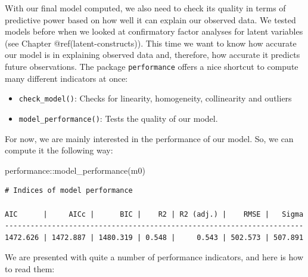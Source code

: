 \documentclass[
  letterpaper,
]{krantz}
\makeatletter
\newenvironment{Shaded}{\begin{snugshade}}{\end{snugshade}}
\newcommand{\FunctionTok}[1]{\textcolor[rgb]{0.28,0.35,0.67}{#1}}
\newcommand{\NormalTok}[1]{\textcolor[rgb]{0.00,0.23,0.31}{#1}}
\newcommand{\SpecialCharTok}[1]{\textcolor[rgb]{0.37,0.37,0.37}{#1}}
\newenvironment{kframe}{%
\medskip{}
\setlength{\fboxsep}{.8em}
 \def\at@end@of@kframe{}%
 \ifinner\ifhmode%
  \def\at@end@of@kframe{\end{minipage}}%
  \begin{minipage}{\columnwidth}%
 \fi\fi%
 \def\FrameCommand##1{\hskip\@totalleftmargin \hskip-\fboxsep
 \colorbox{shadecolor}{##1}\hskip-\fboxsep
     \hskip-\linewidth \hskip-\@totalleftmargin \hskip\columnwidth}%
 \MakeFramed {\advance\hsize-\width
   \@totalleftmargin\z@ \linewidth\hsize
   \@setminipage}}%
 {\par\unskip\endMakeFramed%
 \at@end@of@kframe}
\renewenvironment{Shaded}{\begin{kframe}}{\end{kframe}}
\makeatother
\begin{document}
With our final model computed, we also need to check its quality in
terms of predictive power based on how well it can explain our observed
data. We tested models before when we looked at confirmatory factor
analyses for latent variables (see Chapter @ref(latent-constructs)).
This time we want to know how accurate our model is in explaining
observed data and, therefore, how accurate it predicts future
observations. The package \texttt{performance} offers a nice shortcut to
compute many different indicators at once:

\begin{itemize}
\item
  \texttt{check\_model()}: Checks for linearity, homogeneity,
  collinearity and outliers
\item
  \texttt{model\_performance()}: Tests the quality of our model.
\end{itemize}

For now, we are mainly interested in the performance of our model. So,
we can compute it the following way:

\begin{Shaded}
\begin{Highlighting}[]
\NormalTok{performance}\SpecialCharTok{::}\FunctionTok{model\_performance}\NormalTok{(m0)}
\end{Highlighting}
\end{Shaded}

\begin{verbatim}
# Indices of model performance

AIC      |     AICc |      BIC |    R2 | R2 (adj.) |    RMSE |   Sigma
----------------------------------------------------------------------
1472.626 | 1472.887 | 1480.319 | 0.548 |     0.543 | 502.573 | 507.891
\end{verbatim}

We are presented with quite a number of performance indicators, and here
is how to read them:
\end{document}
